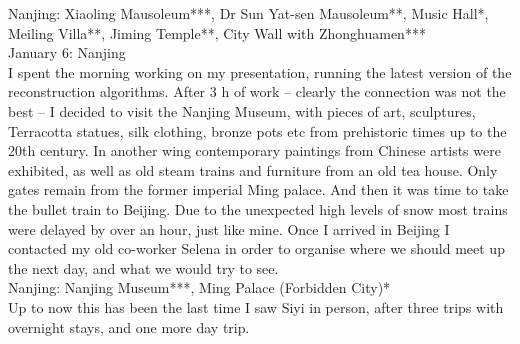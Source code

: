 Nanjing: Xiaoling Mausoleum***, Dr Sun Yat-sen Mausoleum**, Music Hall*, Meiling Villa**, Jiming Temple**, City Wall with Zhonghuamen***\\

January 6: Nanjing\\
I spent the morning working on my presentation, running the latest version of the reconstruction algorithms. After 3 h of work -- clearly the connection was not the best -- I decided to visit the Nanjing Museum, with pieces of art, sculptures, Terracotta statues, silk clothing, bronze pots etc from prehistoric times up to the 20th century. In another wing contemporary paintings from Chinese artists were exhibited, as well as old steam trains and furniture from an old tea house. Only gates remain from the former imperial Ming palace. And then it was time to take the bullet train to Beijing. Due to the unexpected high levels of snow most trains were delayed by over an hour, just like mine. Once I arrived in Beijing I contacted my old co-worker Selena in order to organise where we should meet up the next day, and what we would try to see.\\

Nanjing: Nanjing Museum***, Ming Palace (Forbidden City)*\\

Up to now this has been the last time I saw Siyi in person, after three trips with overnight stays, and one more day trip.\\

